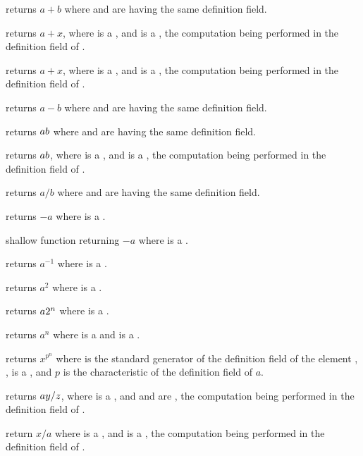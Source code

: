  returns $a+b$ where  and  are
 having the same definition field.

 returns $a+x$, where  is a
, and  is a , the computation being
performed in the definition field of .

 returns $a+x$, where  is a
, and  is a , the computation being
performed in the definition field of .

 returns $a-b$ where  and  are
 having the same definition field.

 returns $a\*b$ where  and  are
 having the same definition field.

 returns $a\*b$, where  is a
, and  is a , the computation being
performed in the definition field of .

 returns $a/b$ where  and  are
 having the same definition field.

 returns $-a$ where  is a .

 shallow function returning $-a$ where  is a
.

 returns $a^{-1}$ where  is a .

 returns $a^2$ where  is a .

 returns $a\*2^n$ where  is a
.

 returns $a^n$ where  is a 
and  is a .

 returns $x^{p^n}$ where  is
the standard generator of the definition field of the  element
, ,  is a , and $p$ is the characteristic
of the definition field of $a$.

 returns $a\*y/z$, where 
is a , and  and  are , the computation being
performed in the definition field of .

 return $x/a$ where  is a
, and  is a , the computation being
performed in the definition field of .

